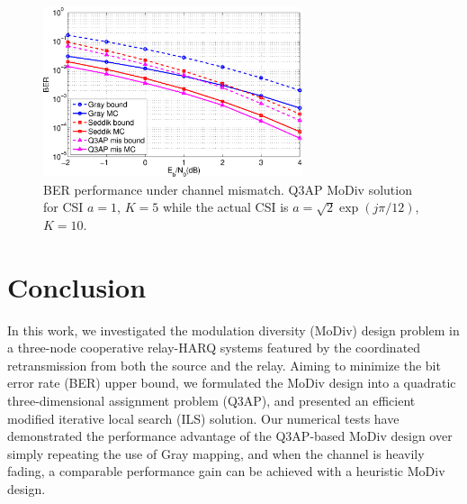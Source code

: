 \documentclass[journal]{IEEEtran}
\begin{document}
\begin{figure}[!t]
    \centering
    \includegraphics[width=3.0in]{./figs/mismatch.eps}
    \caption{BER performance under channel mismatch. Q3AP MoDiv solution for
    CSI
    $a=1$, $K=5$ while the actual CSI is $a = \sqrt{2}\exp(j\pi/12)$, $K
    = 10$.}
    \label{fig:mismatch}
\end{figure}

\section{Conclusion}
\label{sec:conclusion}
In this work, we investigated the modulation diversity (MoDiv) design problem in
a three-node cooperative relay-HARQ systems featured by the coordinated
retransmission from both the source and the relay. Aiming to minimize the bit
error rate (BER) upper bound, we formulated the MoDiv design into a quadratic
three-dimensional assignment problem (Q3AP), and presented an efficient modified
iterative local search (ILS) solution. Our numerical tests have demonstrated the
performance advantage of the Q3AP-based MoDiv design over simply repeating the
use of Gray mapping, and when the channel is heavily fading, a comparable
performance gain can be achieved with a heuristic MoDiv design. 









\end{document}

